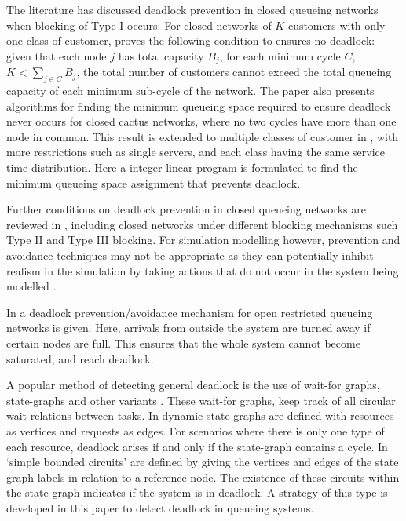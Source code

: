 \documentclass{article}
\numberwithin{equation}{section}
\begin{document}
The literature has discussed deadlock prevention in closed queueing networks
when blocking of Type I occurs.
For closed networks of $K$ customers with only one class of customer,
\cite{kunduakyildiz89} proves the following condition to ensures no deadlock:
given that each node $j$ has total capacity $B_j$, for each minimum cycle $C$,
$K < \sum_{j\in C} B_j$, the total number of customers cannot exceed the total
queueing capacity of each minimum sub-cycle of the network.
The paper also presents algorithms for finding the minimum queueing space
required to ensure deadlock never occurs for closed cactus networks, where no
two cycles have more than one node in common.
This result is extended to multiple classes of customer in
\cite{liebeherrakyildiz95}, with more restrictions such as single servers, and
each class having the same service time distribution.
Here a integer linear program is formulated to find the minimum queueing space
assignment that prevents deadlock.

Further conditions on deadlock prevention in closed queueing networks are
reviewed in \cite{onvural90}, including closed networks under different
blocking mechanisms such Type II and Type III blocking.
For simulation modelling however, prevention and avoidance techniques may not
be appropriate as they can potentially inhibit realism in the simulation by
taking actions that do not occur in the system being modelled
\cite{venkateshetal98}.

In \cite{schmidtjackman00} a deadlock prevention/avoidance mechanism for open
restricted queueing networks is given.
Here, arrivals from outside the system are turned away if certain nodes are
full.
This ensures that the whole system cannot become saturated, and reach deadlock.

A popular method of detecting general deadlock is the use of wait-for graphs,
state-graphs and other variants \cite{cheng90, elmagarmid86, coffmanelphick71,
choetal95, deuermeyeretal97, venkateshetal98, venkateshsmith03,
venkateshsmith05, holt72}.
These wait-for graphs, keep track of all circular wait relations between tasks.
In \cite{coffmanelphick71} dynamic state-graphs are defined with resources as
vertices and requests as edges.
For scenarios where there is only one type of each resource, deadlock arises
if and only if the state-graph contains a cycle.
In \cite{choetal95} `simple bounded circuits' are defined by giving the
vertices and edges of the state graph labels in relation to a reference node.
The existence of these circuits within the state graph indicates if the system
is in deadlock.
A strategy of this type is developed in this paper to detect deadlock in
queueing systems.
\end{document}
